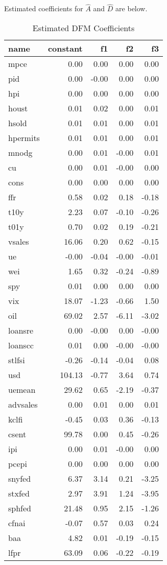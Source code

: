 \documentclass[11pt, letterpaper]{article}\usepackage[]{graphicx}\usepackage[]{color}
\begin{document}
Estimated coefficients for $\widehat{A}$ and $\widehat{D}$ are below.
\begin{table}[H]
\centering
\begingroup\footnotesize
\begin{tabular}{lrrrr}
  \hline
name & constant & f1 & f2 & f3 \\ 
  \hline
mpce & 0.00 & 0.00 & 0.00 & 0.00 \\ 
  pid & 0.00 & -0.00 & 0.00 & 0.00 \\ 
  hpi & 0.00 & 0.00 & 0.00 & 0.00 \\ 
  houst & 0.01 & 0.02 & 0.00 & 0.01 \\ 
  hsold & 0.01 & 0.01 & 0.00 & 0.01 \\ 
  hpermits & 0.01 & 0.01 & 0.00 & 0.01 \\ 
  mnodg & 0.00 & 0.01 & -0.00 & 0.01 \\ 
  cu & 0.00 & 0.01 & -0.00 & 0.00 \\ 
  cons & 0.00 & 0.00 & 0.00 & 0.00 \\ 
  ffr & 0.58 & 0.02 & 0.18 & -0.18 \\ 
  t10y & 2.23 & 0.07 & -0.10 & -0.26 \\ 
  t01y & 0.70 & 0.02 & 0.19 & -0.21 \\ 
  vsales & 16.06 & 0.20 & 0.62 & -0.15 \\ 
  ue & -0.00 & -0.04 & -0.00 & -0.01 \\ 
  wei & 1.65 & 0.32 & -0.24 & -0.89 \\ 
  spy & 0.01 & 0.00 & 0.00 & 0.00 \\ 
  vix & 18.07 & -1.23 & -0.66 & 1.50 \\ 
  oil & 69.02 & 2.57 & -6.11 & -3.02 \\ 
  loansre & 0.00 & -0.00 & 0.00 & -0.00 \\ 
  loanscc & 0.01 & 0.00 & -0.00 & -0.00 \\ 
  stlfsi & -0.26 & -0.14 & -0.04 & 0.08 \\ 
  usd & 104.13 & -0.77 & 3.64 & 0.74 \\ 
  uemean & 29.62 & 0.65 & -2.19 & -0.37 \\ 
  advsales & 0.00 & 0.01 & 0.00 & 0.01 \\ 
  kclfi & -0.45 & 0.03 & 0.36 & -0.13 \\ 
  csent & 99.78 & 0.00 & 0.45 & -0.26 \\ 
  ipi & 0.00 & 0.01 & -0.00 & 0.00 \\ 
  pcepi & 0.00 & 0.00 & 0.00 & 0.00 \\ 
  snyfed & 6.37 & 3.14 & 0.21 & -3.25 \\ 
  stxfed & 2.97 & 3.91 & 1.24 & -3.95 \\ 
  sphfed & 21.48 & 0.95 & 2.15 & -1.26 \\ 
  cfnai & -0.07 & 0.57 & 0.03 & 0.24 \\ 
  baa & 4.82 & 0.01 & -0.19 & -0.15 \\ 
  lfpr & 63.09 & 0.06 & -0.22 & -0.19 \\ 
   \hline
\end{tabular}
\endgroup
\caption{Estimated DFM Coefficients} 
\end{table}
\end{document}
